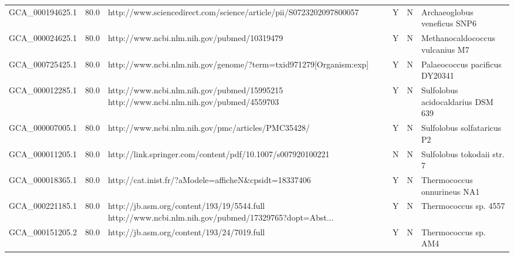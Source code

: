 \documentclass[8pt]{extreport}
\begin{document}
{\begin{longtable}{lrllll}
     GCA\_000194625.1 &                 80.0 &                                   http://www.sciencedirect.com/science/article/pii/S0723202097800057 &                    Y &                    N &                               Archaeoglobus veneficus SNP6 \\
     GCA\_000024625.1 &                 80.0 &                                                          http://www.ncbi.nlm.nih.gov/pubmed/10319479 &                    Y &                    N &                            Methanocaldococcus vulcanius M7 \\
     GCA\_000725425.1 &                 80.0 &                                    http://www.ncbi.nlm.nih.gov/genome/?term=txid971279[Organism:exp] &                    Y &                    N &                             Palaeococcus pacificus DY20341 \\
     GCA\_000012285.1 &                 80.0 &               http://www.ncbi.nlm.nih.gov/pubmed/15995215 http://www.ncbi.nlm.nih.gov/pubmed/4559703 &                    Y &                    N &                          Sulfolobus acidocaldarius DSM 639 \\
     GCA\_000007005.1 &                 80.0 &                                                   http://www.ncbi.nlm.nih.gov/pmc/articles/PMC35428/ &                    Y &                    N &                                 Sulfolobus solfataricus P2 \\
     GCA\_000011205.1 &                 80.0 &                                           http://link.springer.com/content/pdf/10.1007/s007920100221 &                    N &                    N &                                 Sulfolobus tokodaii str. 7 \\
     GCA\_000018365.1 &                 80.0 &                                                http://cat.inist.fr/?aModele=afficheN\&cpsidt=18337406 &                    Y &                    N &                                Thermococcus onnurineus NA1 \\
     GCA\_000221185.1 &                 80.0 &  http://jb.asm.org/content/193/19/5544.full http://www.ncbi.nlm.nih.gov/pubmed/17329765?dopt=Abst... &                    Y &                    N &                                      Thermococcus sp. 4557 \\
     GCA\_000151205.2 &                 80.0 &                                                           http://jb.asm.org/content/193/24/7019.full &                    Y &                    N &                                       Thermococcus sp. AM4 \\

\end{longtable}}
\end{document}
